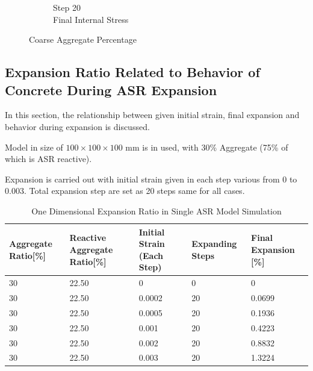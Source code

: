 \begin{figure}[ht!]
\begin{subfigure}{.25\textwidth}
      \caption{Step 20\\Final Internal Stress}
    \end{subfigure}

\caption{Coarse Aggregate Percentage}
\label{fig:ASR_A30P75_3}
\end{figure}

\subsection{Expansion Ratio Related to Behavior of Concrete During ASR Expansion}

In this section, the relationship between given initial strain, final expansion and behavior during expansion is discussed.

Model in size of $100 \times 100 \times 100$ mm is in used, with 30\% Aggregate (75\% of which is ASR reactive).

Expansion is carried out with initial strain given in each step various from 0 to 0.003. Total expansion step are set as 20 steps same for all cases.


\begin{table}[ht!]
  \caption{One Dimensional Expansion Ratio in Single ASR Model Simulation}
\centering
\begin{tabular}{ ||p{2cm}|p{2cm}|p{2cm}|p{2cm}|p{2cm}|| }
 \hline
 Aggregate Ratio[\%] &  Reactive Aggregate Ratio[\%]  & Initial Strain (Each Step) & Expanding Steps & Final Expansion [\%] \\ [0.5ex]
 \hline\hline
 30 & 22.50 & 0 & 0 & 0\\
 30 & 22.50 & 0.0002 & 20 & 0.0699\\
 30 & 22.50 & 0.0005 & 20 & 0.1936\\
 30 & 22.50 & 0.001 & 20 & 0.4223\\
 30 & 22.50 & 0.002 & 20 & 0.8832\\
 30 & 22.50 & 0.003 & 20 & 1.3224\\ [0.5ex]
 \hline
\end{tabular}

\label{table:ASR_30_EXP}
\end{table}

